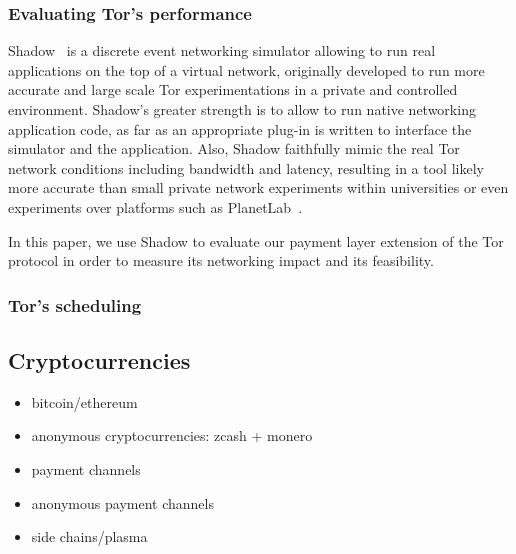 \subsubsection{Evaluating Tor's performance}
Shadow~\cite{shadow-ndss12} is a discrete event networking simulator allowing to run real applications on the top of a virtual network, originally developed to run more accurate and large scale Tor experimentations in a private and controlled environment. Shadow's greater strength is to allow to run native networking application code, as far as an appropriate plug-in is written to interface the simulator and the application. Also, Shadow faithfully mimic the real Tor network conditions including bandwidth and latency, resulting in a tool likely more accurate than small private network experiments within universities or even experiments over platforms such as PlanetLab~\cite{Chun:2003:POT:956993.956995}.

In this paper, we use Shadow to evaluate our payment layer extension of the Tor protocol in order to measure its networking impact and its feasibility.
\subsubsection{Tor's scheduling}


\subsection{Cryptocurrencies}

\begin{itemize}
\item bitcoin/ethereum~\cite{nakamoto2008bitcoin}~\cite{wood2014ethereum}
\item anonymous cryptocurrencies: zcash + monero
\item payment channels
\item anonymous payment channels
\item side chains/plasma
\end{itemize}

